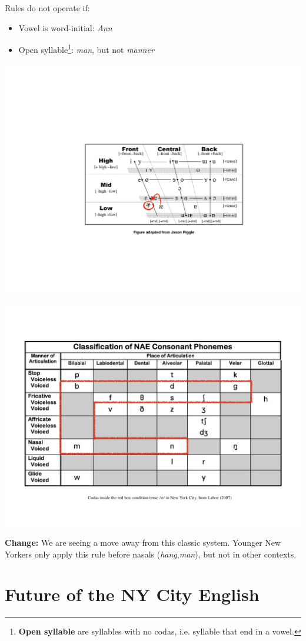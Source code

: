\documentclass[11pt]{article}
\newcommand{\1}{$'$}
\newcommand{\2}{$''$}
\newcommand{\3}{$'''$}
\begin{document}
	Rules do not operate if:
	\begin{itemize}
		\item Vowel is word-initial: \emph{Ann}
		\item Open syllable\footnote{\textbf{Open syllable} are syllables with no codas, i.e. syllable that end in a vowel.}: \emph{man}, but not \emph{manner}
	\end{itemize}
	
		\begin{center}
		\includegraphics[width=.7\textwidth]{a_split}
	\end{center}
	
	
	\begin{center}
			\includegraphics[width=.7\textwidth]{shortA_environments}
	\end{center}

\noindent \textbf{Change:} We are seeing a move away from this classic system. Younger New Yorkers only apply this rule before nasals (\emph{hang},\emph{man}), but not in other contexts.

\section{Future of the NY City English}
\end{document}
